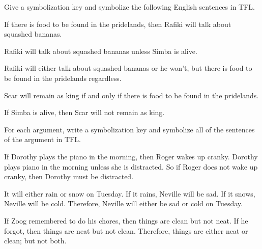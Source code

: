 \solutions
\problempart Give a symbolization key and symbolize the following English sentences in TFL.
\begin{earg}
\item If there is food to be found in the pridelands, then Rafiki will talk about squashed bananas.
\item Rafiki will talk about squashed bananas unless Simba is alive.
\item Rafiki will either talk about squashed bananas or he won't, but there is food to be found in the pridelands regardless.
\item Scar will remain as king if and only if there is food to be found in the pridelands.
\item If Simba is alive, then Scar will not remain as king.
\end{earg}

\problempart
For each argument, write a symbolization key and symbolize all of the sentences of the argument in TFL.
\begin{earg}
\item If Dorothy plays the piano in the morning, then Roger wakes up cranky. Dorothy plays piano in the morning unless she is distracted. So if Roger does not wake up cranky, then Dorothy must be distracted.
\item It will either rain or snow on Tuesday. If it rains, Neville will be sad. If it snows, Neville will be cold. Therefore, Neville will either be sad or cold on Tuesday.
\item If Zoog remembered to do his chores, then things are clean but not neat. If he forgot, then things are neat but not clean. Therefore, things are either neat or clean; but not both.
\end{earg}

